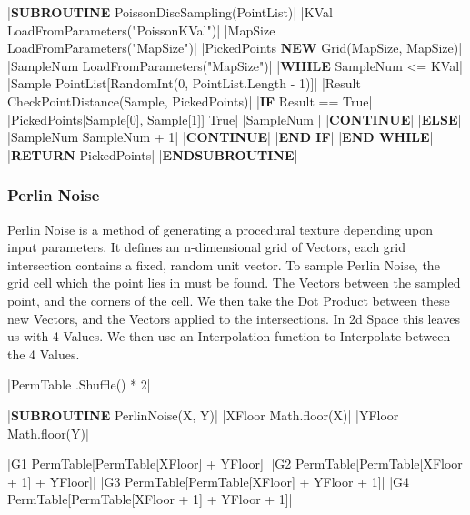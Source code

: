 \begin{flushleft}
                \vspace{0.2cm}
                \begin{pseudocode}
|\textbf{SUBROUTINE} PoissonDiscSampling(PointList)|
    |KVal \leftarrow LoadFromParameters("PoissonKVal")|
    |MapSize \leftarrow LoadFromParameters("MapSize")|
    |PickedPoints \leftarrow \textbf{NEW} Grid(MapSize, MapSize)|
    |SampleNum \leftarrow LoadFromParameters("MapSize")|
    |\textbf{WHILE} SampleNum <= KVal|
        |Sample \leftarrow PointList[RandomInt(0, PointList.Length - 1)]|
        |Result \leftarrow CheckPointDistance(Sample, PickedPoints)|
        |\textbf{IF} Result == True|
            |PickedPoints[Sample[0], Sample[1]] \leftarrow True|
            |SampleNum |
            |\textbf{CONTINUE}|
        |\textbf{ELSE}|
            |SampleNum \leftarrow SampleNum + 1|
            |\textbf{CONTINUE}|
        |\textbf{END IF}|
    |\textbf{END WHILE}|
    |\textbf{RETURN} PickedPoints|
|\textbf{ENDSUBROUTINE}|
                \end{pseudocode}
                
                \vspace{0.5cm}
            \subsubsection{Perlin Noise}
                Perlin Noise is a method of generating a procedural texture depending upon input parameters. It defines an n-dimensional
                grid of Vectors, each grid intersection contains a fixed, random unit vector. To sample Perlin Noise, the grid cell which
                the point lies in must be found. The Vectors between the sampled point, and the corners of the cell. We then take the Dot
                Product between these new Vectors, and the Vectors applied to the intersections. In 2d Space this leaves us with 4 Values.
                We then use an Interpolation function to Interpolate between the 4 Values. 
            
                \vspace{0.2cm}
                \begin{pseudocode}
|PermTable \leftarrow [1 \rightarrow 255].Shuffle() * 2|

|\textbf{SUBROUTINE} PerlinNoise(X, Y)|
    |XFloor \leftarrow Math.floor(X)|
    |YFloor \leftarrow Math.floor(Y)|

    |G1 \leftarrow PermTable[PermTable[XFloor] + YFloor]|
    |G2 \leftarrow PermTable[PermTable[XFloor + 1] + YFloor]|
    |G3 \leftarrow PermTable[PermTable[XFloor] + YFloor + 1]|
    |G4 \leftarrow PermTable[PermTable[XFloor + 1] + YFloor + 1]|


\end{pseudocode}
\end{flushleft}
